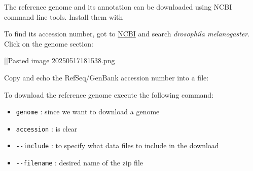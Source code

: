 The reference genome and its annotation can be downloaded using NCBI
command line tools. Install them with

\begin{Shaded}
\begin{Highlighting}[]
\end{Highlighting}
\end{Shaded}

To find its accession number, got to
\href{https://www.ncbi.nlm.nih.gov/}{NCBI} and search \emph{drosophila
melanogaster}. Click on the genome section:

{[}{[}Pasted image 20250517181538.png\textbar400{]}{]}

Copy and echo the RefSeq/GenBank accession number into a file:

\begin{Shaded}
\begin{Highlighting}[]
  \OperatorTok{\textgreater{}}
\end{Highlighting}
\end{Shaded}

To download the reference genome execute the following command:

\begin{Shaded}
\begin{Highlighting}[]
\DataTypeTok{\textbackslash{}}
\OperatorTok{\textgreater{}}\VariableTok{$(}\VariableTok{)} \DataTypeTok{\textbackslash{}}
\OperatorTok{\textgreater{}}\DataTypeTok{\textbackslash{}}
\OperatorTok{\textgreater{}}
\end{Highlighting}
\end{Shaded}

\begin{itemize}
\tightlist
\item
  \texttt{genome} : since we want to download a genome
\item
  \texttt{accession} : is clear
\item
  \texttt{-\/-include} : to specify what data files to include in the
  download
\item
  \texttt{-\/-filename} : desired name of the zip file
\end{itemize}

